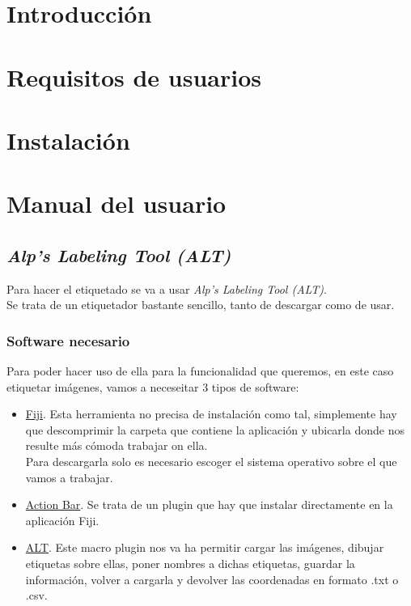 
\section{Introducción}

\section{Requisitos de usuarios}

\section{Instalación}

\section{Manual del usuario}
\subsection{\textit{Alp’s Labeling Tool (ALT)}}

Para hacer el etiquetado se va a usar \textit{Alp’s Labeling Tool (ALT)}.\\
Se trata de un etiquetador bastante sencillo, tanto de descargar como de usar.\\

\subsubsection{Software necesario}
Para poder hacer uso de ella para la funcionalidad que queremos, en este caso etiquetar imágenes, vamos a neceseitar 3 tipos de software:\\
\begin{itemize}
	\item \href{http://fiji.sc/#download}{Fiji}. Esta herramienta no precisa de instalación como tal, simplemente hay que descomprimir la carpeta que contiene la aplicación y ubicarla donde nos resulte más cómoda trabajar on ella.\\
	
	Para descargarla solo es necesario escoger el sistema operativo sobre el que vamos a trabajar.
	\item \href{https://github.com/imagejan/ActionBar/releases/download/SciJava-Parameters/action_bar-2.0.5-SNAPSHOT.jar}{Action Bar}. Se trata de un plugin que hay que instalar directamente en la aplicación Fiji.
	\item \href{https://www.dropbox.com/s/ihkr0ahhif3csvp/ALT_Windows_22mar2017.zip?dl=0}{ALT}. Este macro plugin nos va ha permitir cargar las imágenes, dibujar etiquetas sobre ellas, poner nombres a dichas etiquetas, guardar la información, volver a cargarla y devolver las coordenadas en formato .txt o .csv.
\end{itemize}

